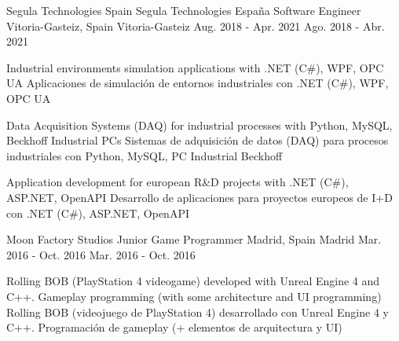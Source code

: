 \begin{cventries}
	\cventry
	{
			{Segula Technologies Spain}
			{Segula Technologies España}
	} %
	{
		Software Engineer 
	} %
	{
			{Vitoria-Gasteiz, Spain}
			{Vitoria-Gasteiz}
	} %
	{
			{Aug. 2018 - Apr. 2021}
			{Ago. 2018 - Abr. 2021}
	} %
	{
		\begin{cvitems} %
			\item {
					{Industrial environments simulation applications with .NET (C\#), WPF, OPC UA}
					{Aplicaciones de simulación de entornos industriales con .NET (C\#), WPF, OPC UA}
			}
			\item {
					{Data Acquisition Systems (DAQ) for industrial processes with Python, MySQL, Beckhoff Industrial PCs}
					{Sistemas de adquisición de datos (DAQ) para procesos industriales con Python, MySQL, PC Industrial Beckhoff}
			}
			\item {
					{Application development for european R\&D projects with .NET (C\#), ASP.NET, OpenAPI}
					{Desarrollo de aplicaciones para proyectos europeos de I+D con .NET (C\#), ASP.NET, OpenAPI}
			}
		\end{cvitems}
	}
	
	\cventry
	{
		Moon Factory Studios
	} %
	{
		Junior Game Programmer
	} %
	{
		{Madrid, Spain}
		{Madrid}
	} %
	{
		{Mar. 2016 - Oct. 2016}
		{Mar. 2016 - Oct. 2016}
	} %
	{
		\begin{cvitems} %
			\item {
				{Rolling BOB (PlayStation 4 videogame) developed with Unreal Engine 4 and C++. Gameplay programming (with some architecture and UI programming)}
				{Rolling BOB (videojuego de PlayStation 4) desarrollado con Unreal Engine 4 y C++. Programación de gameplay (+ elementos de arquitectura y UI)}
			}
		\end{cvitems}
	}
	
	
	
\end{cventries}
